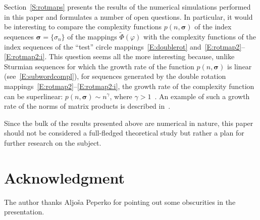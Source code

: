 \documentclass[a4paper,10pt,reqno]{amsart}
\let\cite\citep
\begin{document}
Section~\ref{S:rotmaps} presents the results of the numerical simulations
performed in this paper and formulates a number of open questions. In
particular, it would be interesting to compare the complexity functions
$p(n,\boldsymbol{\sigma})$ of the index sequences
$\boldsymbol{\sigma}=\{\sigma_{n}\}$ of the mappings
$\tilde{\varPhi}(\varphi)$ with the complexity functions of the index
sequences of the ``test'' circle mappings~\eqref{E:doublerot}
and~\eqref{E:rotmap2}--\eqref{E:rotmap2:i}. This question seems all the more
interesting because, unlike Sturmian sequences for which the growth rate of
the function $p(n,\boldsymbol{\sigma})$ is linear
(see~\eqref{E:subwordcompl}), for sequences generated by the double rotation
mappings~\eqref{E:rotmap2}--\eqref{E:rotmap2:i}, the growth rate of the
complexity function can be superlinear: $p(n,\boldsymbol{\sigma})\sim
n^{\gamma}$, where $\gamma > 1$~\cite{Clack:13}. An example of such a growth
rate of the norms of matrix products is described in~\cite{HMS:MPCPS13}.

Since the bulk of the results presented above are numerical in nature, this
paper should not be considered a full-fledged theoretical study but rather a
plan for further research on the subject.

\section*{Acknowledgment}
The author thanks Aljo{\v{s}}a Peperko for pointing out some obscurities in
the presentation.

\end{document}
